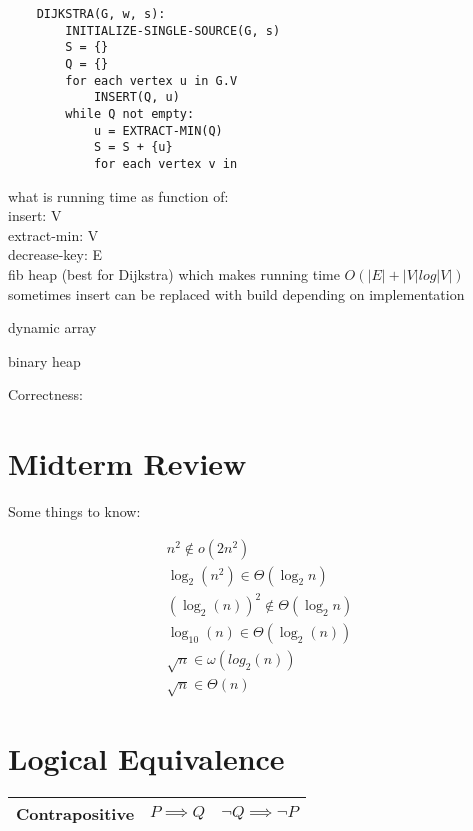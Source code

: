 \documentclass{article}
\begin{document}
\begin{verbatim}
    DIJKSTRA(G, w, s):
        INITIALIZE-SINGLE-SOURCE(G, s)
        S = {}
        Q = {}
        for each vertex u in G.V 
            INSERT(Q, u)
        while Q not empty:
            u = EXTRACT-MIN(Q)
            S = S + {u}
            for each vertex v in 

\end{verbatim}

what is running time as function of:\\

insert: V\\
extract-min: V \\
decrease-key: E\\


fib heap (best for Dijkstra) which makes running time $O(|E| + |V|log|V|)$\\
sometimes insert can be replaced with build depending on implementation

dynamic array

binary heap

Correctness:



\section{Midterm Review}
Some things to know:

\begin{align*}
    n^2 \notin o(2n^2)\\
    \log_2 (n^2) \in \Theta (\log_2 n)\\
   (\log_2 (n))^2 \notin \Theta (\log_2 n)\\
   \log_{10}(n) \in \Theta (\log_2(n))\\
   \sqrt{n} \in \omega(log_2(n))\\
   \sqrt{n} \in \Theta(n)
\end{align*}



\section{Logical Equivalence}


\begin{tabular}{|c|c|c|}
    \hline
    Contrapositive & $P \implies Q$ & $\neg Q \implies \neg P$ \\
    \hline

\end{tabular}
\end{document}
